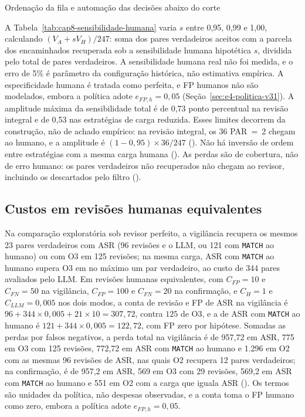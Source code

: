 \begin{chapter}{Ordenação da fila e automação das decisões abaixo do corte}


A Tabela~\ref{tab:cap8-sensibilidade-humana} varia $s$ entre 0,95, 0,99 e 1,00, calculando $(V_A+sV_H)/247$: soma dos pares verdadeiros aceitos com a parcela dos encaminhados recuperada sob a sensibilidade humana hipotética $s$, dividida pelo total de pares verdadeiros. A sensibilidade humana real não foi medida, e o erro de 5\% é parâmetro da configuração histórica, não estimativa empírica. A especificidade humana é tratada como perfeita, e FP humanos não são modelados, embora a política adote $e_{FP,h}=0{,}05$ (Seção~\ref{sec:e4-politica-v31}). A amplitude máxima da sensibilidade total é de 0,73 ponto percentual na revisão integral e de 0,53 nas estratégias de carga reduzida. Esses limites decorrem da construção, não de achado empírico: na revisão integral, os 36 PAR~=~2 chegam ao humano, e a amplitude é $(1-0{,}95)\times36/247$ (). Não há inversão de ordem entre estratégias com a mesma carga humana (). As perdas são de cobertura, não de erro humano: os pares verdadeiros não recuperados não chegam ao revisor, incluindo os descartados pelo filtro ().

\subsection{Custos em revisões humanas equivalentes}\label{sec:e4-custos-equivalentes}

Na comparação exploratória sob revisor perfeito, a vigilância recupera os mesmos 23 pares verdadeiros com ASR (96 revisões e o LLM, ou 121 com \texttt{MATCH} ao humano) ou com O3 em 125 revisões; na mesma carga, ASR com \texttt{MATCH} ao humano supera O3 em no máximo um par verdadeiro, ao custo de 344 pares avaliados pelo LLM. Em revisões humanas equivalentes, com $C_{FP}=10$ e $C_{FN}=50$ na vigilância, $C_{FP}=100$ e $C_{FN}=20$ na confirmação, e $C_H=1$ e $C_{LLM}=0{,}005$ nos dois modos, a conta de revisão e FP de ASR na vigilância é $96+344\times0{,}005+21\times10=307{,}72$, contra $125$ de O3, e a de ASR com \texttt{MATCH} ao humano é $121+344\times0{,}005=122{,}72$, com FP zero por hipótese. Somadas as perdas por falsos negativos, a perda total na vigilância é de 957,72 em ASR, 775 em O3 com 125 revisões, 772,72 em ASR com \texttt{MATCH} ao humano e 1.296 em O2 com as mesmas 96 revisões de ASR, nas quais O2 recupera 12 pares verdadeiros; na confirmação, é de 957,2 em ASR, 569 em O3 com 29 revisões, 569,2 em ASR com \texttt{MATCH} ao humano e 551 em O2 com a carga que iguala ASR (). Os termos são unidades da política, não despesas observadas, e a conta toma o FP humano como zero, embora a política adote $e_{FP,h}=0{,}05$.


\end{chapter}
